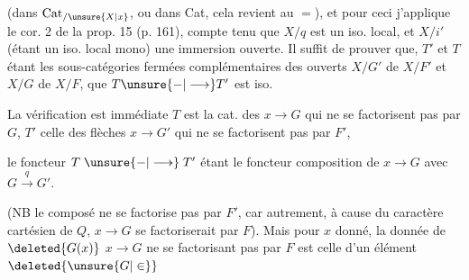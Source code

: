 
(dans $\mathrm{Cat}_{/\unsure{X|x}}$, ou dans Cat, cela revient au $=$), et pour ceci j'applique le cor. 2 de la prop. 15 (p. 161), compte tenu que $X/q$ est un iso. local, et $X/i'$ (étant un iso. local mono) une immersion ouverte. Il suffit de prouver que,  $T'$ et $T$ étant les  sous-catégories fermées complémentaires des ouverts $X/G'$ de $X/F'$ et $X/G$ de $X/F$, que $T\unsure{-|\longrightarrow}T'$ est iso.

La vérification est immédiate \unsure{;} $T$ est la cat. des  $x\longrightarrow G$    qui ne se factorisent pas par $G$, $T'$ celle des flèches $x\longrightarrow G'$ qui ne se factorisent pas par $F'$,


le foncteur $T\mathrel{\unsure{-|\longrightarrow}}T'$ étant le foncteur composition de $x\longrightarrow G$ avec $G\xrightarrow{q}G'$.

 (NB le composé ne se factorise pas par $F'$, car autrement, à cause du caractère cartésien de $Q$, $x\longrightarrow G$ se factoriserait par $F$). Mais pour $x$ donné, la donnée de $\deleted{G(x)}$ $x\longrightarrow G$ ne se factorisant pas par $F$ est celle d'un élément $\deleted{\unsure{G|\in}}$
